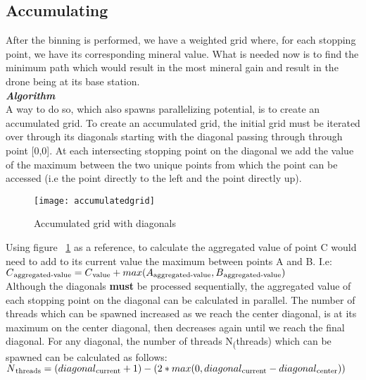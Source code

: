\documentclass[11pt]{IEEEtran}
\begin{document}
\subsection{Accumulating}
After the binning is performed, we have a weighted grid where, for each stopping point, we have its corresponding mineral value. What is needed now is to find the minimum path which would result in the most mineral gain and result in the drone being at its base station. \\

\textit{\textbf{Algorithm}}\\[1\baselineskip] 
A way to do so, which also spawns parallelizing potential, is to create an accumulated grid. To create an accumulated grid, the initial grid must be iterated over through its diagonals starting with the diagonal passing through through point [0,0]. At each intersecting stopping point on the diagonal we add the value of the maximum between the two unique points from which the point can be accessed (i.e the point directly to the left and the point directly up).

\begin{figure}[ht]
\caption[Accumulated grid]{Accumulated grid with diagonals}
\label{Accumulated grid}
\begin{center}
\texttt{[image: accumulatedgrid]}
\end{center}
\end{figure}

Using figure ~\ref{Accumulated grid} as a reference, to calculate the aggregated value of point C would need to add to its current value the maximum between points A and B. I.e: \\[1\baselineskip]
$ C\textsubscript{aggregated-value} = C\textsubscript{value} + max(A\textsubscript{aggregated-value}, B\textsubscript{aggregated-value}) $\\

Although the diagonals \textbf{must} be processed sequentially, the aggregated value of each stopping point on the diagonal can be calculated in parallel. The number of threads which can be spawned increased as we reach the center diagonal, is at its maximum on the center diagonal, then decreases again until we reach the final diagonal. For any diagonal, the number of threads N\textsubscript(threads) which can be spawned can be calculated as follows:\\[1\baselineskip]
$ N\textsubscript{threads} = (diagonal\textsubscript{current} +1) - (2 * max(0, diagonal\textsubscript{current} - diagonal\textsubscript{center})) $ \\
\end{document}
